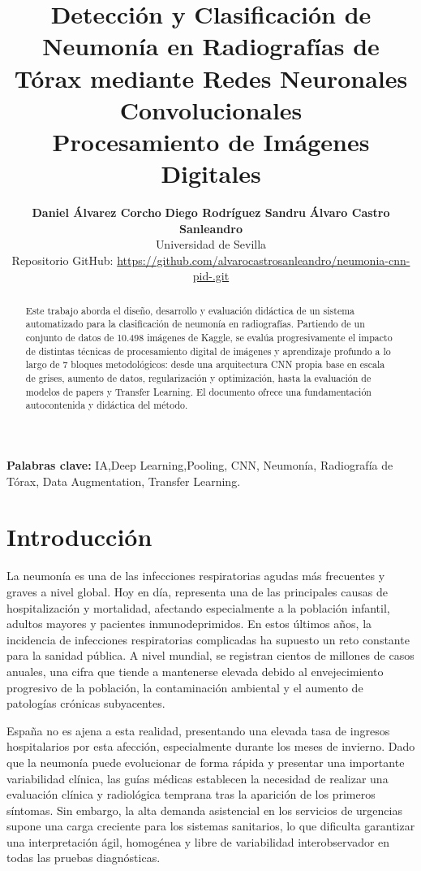 \documentclass[11pt, a4paper]{article}
\title{
\Huge \textbf{Detección y Clasificación de Neumonía en Radiografías de Tórax mediante Redes Neuronales Convolucionales}\\[0.5cm]
\Large \textbf{Procesamiento de Imágenes Digitales }
}
\author{
\textbf{Daniel Álvarez Corcho}
\quad
\textbf{Diego Rodríguez Sandru}
\quad
\textbf{Álvaro Castro Sanleandro}\\[0.3cm]
\small Universidad de Sevilla \\
\small Repositorio GitHub: \url{https://github.com/alvarocastrosanleandro/neumonia-cnn-pid-.git}
}
\numberwithin{equation}{section}
\begin{document}
\maketitle
\thispagestyle{empty}

\begin{abstract}
\noindent
Este trabajo aborda el diseño, desarrollo y evaluación didáctica de un sistema automatizado para la clasificación de neumonía en radiografías. Partiendo de un conjunto de datos de 10.498 imágenes de Kaggle, se evalúa progresivamente el impacto de distintas técnicas de procesamiento digital de imágenes y aprendizaje profundo a lo largo de 7 bloques metodológicos: desde una arquitectura CNN propia base en escala de grises, aumento de datos, regularización y optimización, hasta la evaluación de modelos de papers y Transfer Learning. El documento ofrece una fundamentación autocontenida y didáctica del método.
\end{abstract}

\noindent
\textbf{Palabras clave:} IA,Deep Learning,Pooling, CNN, Neumonía, Radiografía de Tórax, Data Augmentation, Transfer Learning.

\newpage
\tableofcontents
\newpage

\newpage
\section{Introducción}

La neumonía es una de las infecciones respiratorias agudas más frecuentes y graves a nivel global. Hoy en día, representa una de las principales causas de hospitalización y mortalidad, afectando especialmente a la población infantil, adultos mayores y pacientes inmunodeprimidos. En estos últimos años, la incidencia de infecciones respiratorias complicadas ha supuesto un reto constante para la sanidad pública. A nivel mundial, se registran cientos de millones de casos anuales, una cifra que tiende a mantenerse elevada debido al envejecimiento progresivo de la población, la contaminación ambiental y el aumento de patologías crónicas subyacentes.

España no es ajena a esta realidad, presentando una elevada tasa de ingresos hospitalarios por esta afección, especialmente durante los meses de invierno. Dado que la neumonía puede evolucionar de forma rápida y presentar una importante variabilidad clínica, las guías médicas establecen la necesidad de realizar una evaluación clínica y radiológica temprana tras la aparición de los primeros síntomas. Sin embargo, la alta demanda asistencial en los servicios de urgencias supone una carga creciente para los sistemas sanitarios, lo que dificulta garantizar una interpretación ágil, homogénea y libre de variabilidad interobservador en todas las pruebas diagnósticas.
\end{document}
